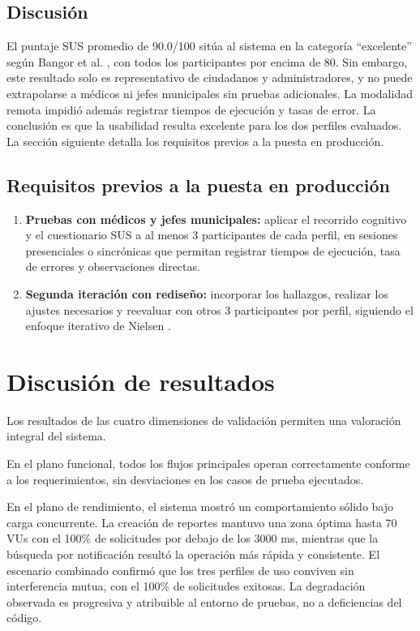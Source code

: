 \subsection{Discusión}

El puntaje SUS promedio de 90.0/100 sitúa al sistema en la categoría ``excelente'' según Bangor et al. \cite{bangor2009}, con todos los participantes por encima de 80. Sin embargo, este resultado solo es representativo de ciudadanos y administradores, y no puede extrapolarse a médicos ni jefes municipales sin pruebas adicionales. La modalidad remota impidió además registrar tiempos de ejecución y tasas de error. 
La conclusión es que la usabilidad resulta excelente para los dos perfiles evaluados. 
La sección siguiente detalla los requisitos previos a la puesta en producción.

\subsection{Requisitos previos a la puesta en producción}

\begin{enumerate}
    \item \textbf{Pruebas con médicos y jefes municipales:} aplicar el recorrido cognitivo y el cuestionario SUS a al menos 3 participantes de cada perfil, en sesiones presenciales o sincrónicas que permitan registrar tiempos de ejecución, tasa de errores y observaciones directas.
    \item \textbf{Segunda iteración con rediseño:} incorporar los hallazgos, realizar los ajustes necesarios y reevaluar con otros 3 participantes por perfil, siguiendo el enfoque iterativo de Nielsen \cite{nielsen2000}.
\end{enumerate}

\section{Discusión de resultados}

Los resultados de las cuatro dimensiones de validación permiten una valoración integral del sistema.

En el plano funcional, todos los flujos principales operan correctamente conforme a los requerimientos, sin desviaciones en los casos de prueba ejecutados.

En el plano de rendimiento, el sistema mostró un comportamiento sólido bajo carga concurrente. La creación de reportes mantuvo una zona óptima hasta 70 VUs con el 100\% de solicitudes por debajo de los 3000 ms, mientras que la búsqueda por notificación resultó la operación más rápida y consistente. El escenario combinado confirmó que los tres perfiles de uso conviven sin interferencia mutua, con el 100\% de solicitudes exitosas. 
La degradación observada es progresiva y atribuible al entorno de pruebas, no a deficiencias del código.

